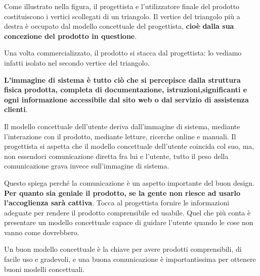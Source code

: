 Come illustrato nella figura, il progettista e l'utilizzatore finale del prodotto costituiscono i vertici scollegati di un triangolo. Il vertice del triangolo più a destra è occupato dal modello concettuale del progettista, \textbf{cioè dalla sua concezione del prodotto in questione}.

Una volta commercializzato, il prodotto si stacca dal progettista: lo vediamo infatti isolato nel secondo vertice del triangolo.

\textbf{L'immagine di sistema è tutto ciò che si percepisce dalla struttura fisica prodotta, completa di documentazione, istruzioni,significanti e ogni informazione accessibile dal sito web o dal servizio di assistenza clienti}.

Il modello concettuale dell'utente deriva dall'immagine di sistema, mediante l'interazione con il prodotto, mediante letture, ricerche online e manuali. Il progettista si aspetta che il modello concettuale dell'utente coincida col suo, ma, non essendoci comunicazione diretta fra lui e l'utente, tutto il peso della comunicazione grava invece sull'immagine di sistema.

Questo spiega perché la comunicazione è un aspetto importante del buon design. \textbf{ Per quanto sia geniale il prodotto, se la gente non riesce ad usarlo l'accoglienza sarà cattiva}. Tocca al progettista fornire le informazioni adeguate per rendere il prodotto comprensibile ed usabile. Quel che più conta è presentare un modello concettuale capace di guidare l'utente quando le cose non vanno come dovrebbero.

Un buon modello concettuale è la chiave per avere prodotti comprensibili, di facile uso e gradevoli, e una buona comunicazione è importantissima per ottenere buoni modelli concettuali.

\pagebreak

